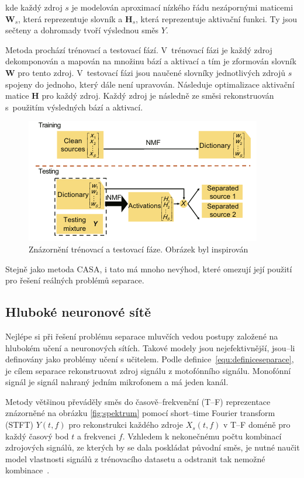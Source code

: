 kde každý zdroj $s$ je modelován aproximací nízkého řádu nezápornými maticemi $\textbf{W}_s$, která reprezentuje slovník a $\textbf{H}_s$, která reprezentuje aktivační funkci. Ty jsou sečteny a dohromady tvoří výslednou směs $Y$.

Metoda prochází trénovací a testovací fází.
V~trénovací fázi je každý zdroj dekomponován a mapován na množinu bází a aktivací a tím je zformován slovník $\textbf{W}$ pro tento zdroj.
V~testovací fázi jsou naučené slovníky jednotlivých zdrojů $s$ spojeny do jednoho, který dále není upravován. Následuje optimalizace aktivační matice $\textbf{H}$ pro každý zdroj. Každý zdroj je následně ze směsi rekonstruován s~použitím výsledných bází a aktivací.

\begin{figure}[H]
    \centering
    \includegraphics[scale=0.6]{obrazky-figures/nmf.png}
    \caption{\label{fig:nmf}Znázornění trénovací a testovací fáze. Obrázek byl inspirován~\cite{speechseparation}}
\end{figure}

Stejně jako metoda CASA, i tato má mnoho nevýhod, které omezují její použití pro řešení reálných problémů separace.




\subsection{Hluboké neuronové sítě}
Nejlépe si při řešení problému separace mluvčích vedou postupy založené na hlubokém učení a neuronových sítích. Takové modely jsou nejefektivnější, jsou--li definovány jako problémy učení s učitelem. Podle definice~\ref{equ:definiceseparace}, je cílem separace rekonstruovat zdroj signálu z motofónního signálu. Monofónní signál je signál nahraný jedním mikrofonem a má jeden kanál.

Metody většinou převáděly směs do časově--frekvenční (T--F) reprezentace znázorněné na obrázku \ref{fig:spektrum} pomocí short--time Fourier transform (STFT) $Y(t,f)$ pro rekonstrukci každého zdroje $X_s(t,f)$ v T--F doméně pro každý časový bod $t$ a frekvenci $f$. Vzhledem k nekonečnému počtu kombinací zdrojových signálů, ze kterých by se dala poskládat původní směs, je nutné naučit model vlastnosti signálů z trénovacího datasetu a odstranit tak nemožné kombinace~\cite{cocktailparty}.

